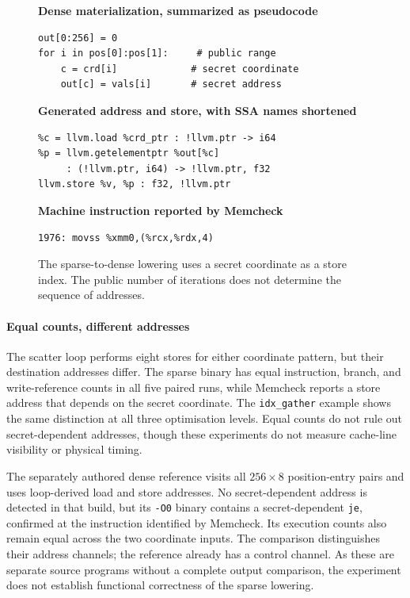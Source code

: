 \begin{figure}[!ht]
\centering
\begin{minipage}{0.97\columnwidth}
\footnotesize
\setlength{\topsep}{2pt}
\textbf{Dense materialization, summarized as pseudocode}
\begin{verbatim}
out[0:256] = 0
for i in pos[0]:pos[1]:     # public range
    c = crd[i]             # secret coordinate
    out[c] = vals[i]       # secret address
\end{verbatim}
\textbf{Generated address and store, with SSA names shortened}
\begin{verbatim}
%c = llvm.load %crd_ptr : !llvm.ptr -> i64
%p = llvm.getelementptr %out[%c]
     : (!llvm.ptr, i64) -> !llvm.ptr, f32
llvm.store %v, %p : f32, !llvm.ptr
\end{verbatim}
\textbf{Machine instruction reported by Memcheck}
\begin{verbatim}
1976: movss %xmm0,(%rcx,%rdx,4)
\end{verbatim}
\end{minipage}
\caption{The sparse-to-dense lowering uses a secret coordinate as a store index. The public number of iterations does not determine the sequence of addresses.}
\label{fig:sparse-address}
\end{figure}

\paragraph{Equal counts, different addresses}
The scatter loop performs eight stores for either coordinate pattern, but their destination addresses differ.
The sparse binary has equal instruction, branch, and write-reference counts in all five paired runs, while Memcheck reports a store address that depends on the secret coordinate.
The \texttt{idx\_gather} example shows the same distinction at all three optimisation levels.
Equal counts do not rule out secret-dependent addresses, though these experiments do not measure cache-line visibility or physical timing.

The separately authored dense reference visits all \(256\times8\) position-entry pairs and uses loop-derived load and store addresses.
No secret-dependent address is detected in that build, but its \texttt{-O0} binary contains a secret-dependent \texttt{je}, confirmed at the instruction identified by Memcheck.
Its execution counts also remain equal across the two coordinate inputs.
The comparison distinguishes their address channels; the reference already has a control channel.
As these are separate source programs without a complete output comparison, the experiment does not establish functional correctness of the sparse lowering.

